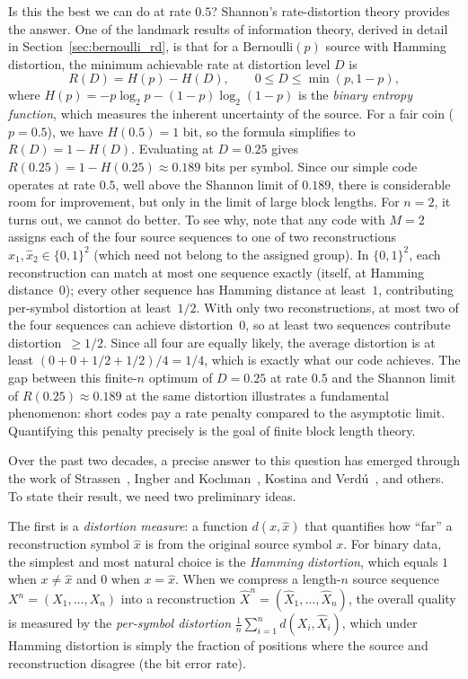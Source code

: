 \documentclass[11pt]{article}
\newcommand{\RD}{R(D)}
\newcommand{\Hp}{H(p)}
\newcommand{\HD}{H(D)}
\newcommand{\Ber}{\mathrm{Bernoulli}}
\begin{document}
Is this the best we can do at rate $0.5$?
Shannon's rate-distortion theory provides the answer.
One of the landmark results of information theory, derived in detail in
Section~\ref{sec:bernoulli_rd}, is that for a $\Ber(p)$ source with Hamming
distortion, the minimum achievable rate at distortion level $D$ is
\begin{equation}
\label{eq:rd_intro}
\RD = \Hp - \HD, \qquad 0 \leq D \leq \min(p, 1-p),
\end{equation}
where $\Hp = -p\log_2 p - (1-p)\log_2(1-p)$ is the \emph{binary entropy
function}, which measures the inherent uncertainty of the source.
For a fair coin ($p = 0.5$), we have $H(0.5) = 1$ bit, so the formula
simplifies to $\RD = 1 - \HD$.
Evaluating at $D = 0.25$ gives $R(0.25) = 1 - H(0.25) \approx 0.189$ bits
per symbol.
Since our simple code operates at rate $0.5$, well above the Shannon limit of
$0.189$, there is considerable room for improvement, but only in the limit of
large block lengths.
For $n = 2$, it turns out, we cannot do better.
To see why, note that any code with $M = 2$ assigns each of the four source
sequences to one of two reconstructions $\hat{x}_1, \hat{x}_2 \in \{0,1\}^2$
(which need not belong to the assigned group).
In $\{0,1\}^2$, each reconstruction can match at most one sequence exactly
(itself, at Hamming distance~$0$); every other sequence has Hamming
distance at least~$1$, contributing per-symbol distortion at least~$1/2$.
With only two reconstructions, at most two of the four sequences can achieve
distortion~$0$, so at least two sequences contribute distortion~$\geq 1/2$.
Since all four are equally likely, the average distortion is at least
$(0 + 0 + 1/2 + 1/2)/4 = 1/4$, which is exactly what our code achieves.
The gap between this finite-$n$ optimum of $D = 0.25$ at rate $0.5$ and the
Shannon limit of $R(0.25) \approx 0.189$ at the same distortion illustrates a
fundamental phenomenon: short codes pay a rate penalty compared to the
asymptotic limit.
Quantifying this penalty precisely is the goal of finite block length theory.

Over the past two decades, a precise answer to this question has emerged through
the work of Strassen~\cite{strassen1962},
Ingber and Kochman~\cite{ingber2011},
Kostina and Verd\'{u}~\cite{kostina2012}, and others.
To state their result, we need two preliminary ideas.

The first is a \emph{distortion measure}: a function $d(x, \hat{x})$ that
quantifies how ``far'' a reconstruction symbol $\hat{x}$ is from the original
source symbol $x$.
For binary data, the simplest and most natural choice is the \emph{Hamming
distortion}, which equals $1$ when $x \neq \hat{x}$ and $0$ when $x = \hat{x}$.
When we compress a length-$n$ source sequence $X^n = (X_1, \ldots, X_n)$ into
a reconstruction $\hat{X}^n = (\hat{X}_1, \ldots, \hat{X}_n)$, the overall
quality is measured by the \emph{per-symbol distortion}
$\frac{1}{n}\sum_{i=1}^{n} d(X_i, \hat{X}_i)$,
which under Hamming distortion is simply the fraction of positions where the
source and reconstruction disagree (the bit error rate).
\end{document}

